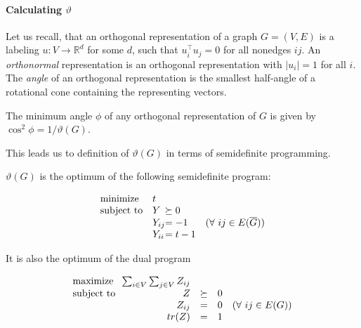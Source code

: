 \paragraph{Calculating \boldmath$\vartheta$}

Let us recall, that an orthogonal representation of a graph $G = (V, E)$ is a labeling $u: V \rightarrow \mathbb{R}^d$ for some $d$, such that $u_i^\intercal u_j = 0$ for all nonedges $ij$. An \emph{orthonormal} representation is an orthogonal representation with $|u_i| = 1$ for all $i$. The \emph{angle} of an orthogonal representation is the smallest half-angle of a rotational cone containing the representing vectors.

\begin{theorem}
  The minimum angle $\phi$ of any orthogonal representation of $G$ is given by $\cos^2\phi = 1/\vartheta(G)$.
\end{theorem}

This leads us to definition of $\vartheta(G)$ in terms of semidefinite programming.

\begin{theorem}
  $\vartheta(G)$ is the optimum of the following semidefinite program:

  \begin{equation*}
    \begin{array}{ll@{}ll}
      \text{minimize}   & t      &                                              \\
      \text{subject to} & Y      & \succeq 0                                    \\
                        & Y_{ij} & = -1      & (\forall~ij \in E(\overline{G})) \\
                        & Y_{ii} & = t - 1                                      \\
    \end{array}
  \end{equation*}

  It is also the optimum of the dual program

  \begin{equation*}
    \begin{array}{l@{}rlll}
      \text{maximize~~}   & \sum_{i \in V} \sum_{j \in V}  Z_{ij} &                                     \\
      \text{subject to~~} & Z                                     & \succeq & 0                         \\
                          & Z_{ij}                                & =       & 0 & (\forall~ij \in E(G)) \\
                          & tr(Z)                                 & =       & 1                         \\
    \end{array}
  \end{equation*}
\end{theorem}

